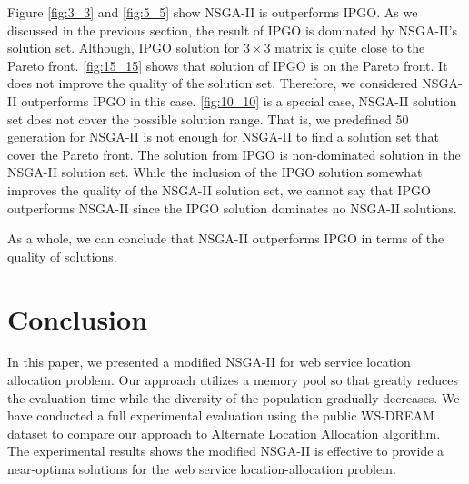 \documentclass{llncs}
\begin{document}
Figure \ref{fig:3_3} and \ref{fig:5_5} show NSGA-II is outperforms IPGO. As we discussed in the previous section, the 
result of IPGO is dominated by NSGA-II's solution set. Although, IPGO solution for $3 \times 3$ matrix is quite close to the 
Pareto front. \ref{fig:15_15} shows that solution of IPGO is on the Pareto front. It does not improve the quality of the solution
set. Therefore, we considered NSGA-II outperforms IPGO in this case. \ref{fig:10_10} is a special case, NSGA-II solution set does
not cover the possible solution range. That is, we predefined 50 generation for NSGA-II is not enough for NSGA-II to find a solution
set that cover the Pareto front. The solution from IPGO is non-dominated solution in the NSGA-II solution set. While the inclusion
of the IPGO solution somewhat improves the quality of the NSGA-II solution set, we cannot say that IPGO outperforms NSGA-II since the 
IPGO solution dominates no NSGA-II solutions.

As a whole, we can conclude that NSGA-II outperforms IPGO in terms of the quality of solutions.


\section{Conclusion}
In this paper, we presented a modified NSGA-II for web service location allocation problem. Our approach utilizes a memory pool so that
greatly reduces the evaluation time while the diversity of the population gradually decreases. We have conducted a full experimental evaluation using the public WS-DREAM dataset to compare our approach to Alternate Location Allocation algorithm. 
The experimental results shows the modified NSGA-II is effective to provide a near-optima solutions for the web service location-allocation problem.




\end{document}

